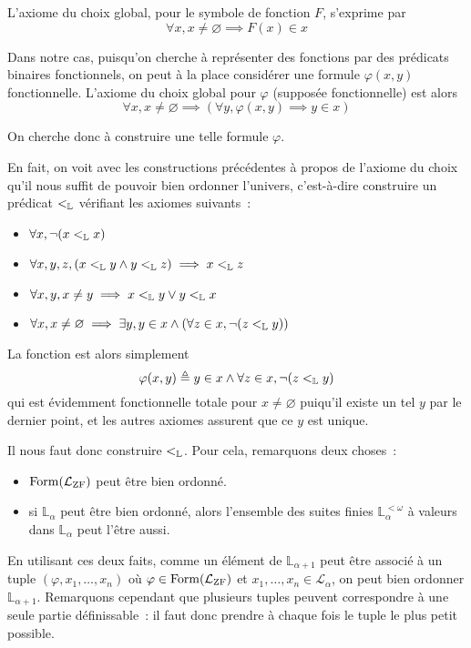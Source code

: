 \begin{axiom}
  L'axiome du choix global, pour le symbole de fonction $F$, s'exprime par
  \[\forall x, x\neq \varnothing \implies F(x)\in x\]
\end{axiom}

Dans notre cas, puisqu'on cherche à représenter des fonctions par des prédicats
binaires fonctionnels, on peut à la place considérer une formule $\varphi(x,y)$
fonctionnelle. L'axiome du choix global pour $\varphi$ (supposée fonctionnelle)
est alors
\[\forall x, x \neq \varnothing \implies (\forall y, \varphi(x,y)\implies
y\in x)\]

On cherche donc à construire une telle formule $\varphi$.

En fait, on voit avec les constructions précédentes à propos de l'axiome du
choix qu'il nous suffit de pouvoir bien ordonner l'univers, c'est-à-dire
construire un prédicat $<_{\mathbb L}$ vérifiant les axiomes suivants~:
\begin{itemize}
\item $\forall x, \lnot(x <_{\mathbb L} x)$
\item $\forall x,y,z, (x <_{\mathbb L} y \land y <_{\mathbb L} z) \implies x <_{\mathbb L} z$
\item $\forall x,y, x\neq y \implies x <_{\mathbb L} y \lor y <_{\mathbb L} x$
\item $\forall x, x\neq \varnothing \implies
  \exists y, y \in x \land (\forall z \in x, \lnot (z <_{\mathbb L} y))$
\end{itemize}
La fonction est alors simplement
\[\varphi(x,y) \triangleq y \in x \land \forall z \in x, \lnot(z <_{\mathbb L} y)\]
qui est évidemment fonctionnelle totale pour $x\neq \varnothing$ puiqu'il existe
un tel $y$ par le dernier point, et les autres axiomes assurent que ce $y$ est
unique.

Il nous faut donc construire $<_{\mathbb L}$. Pour cela, remarquons deux choses~:
\begin{itemize}
\item $\operatorname{Form}(\mathcal L_{\operatorname{ZF}})$ peut être bien ordonné.
\item si $\mathbb L_\alpha$ peut être bien ordonné, alors l'ensemble des
  suites finies $\mathbb L_\alpha^{<\omega}$ à valeurs dans $\mathbb L_\alpha$
  peut l'être aussi.
\end{itemize}
En utilisant ces deux faits, comme un élément de $\mathbb L_{\alpha + 1}$
peut être associé à un tuple $(\varphi,x_1,\ldots,x_n)$ où
$\varphi\in\operatorname{Form}(\mathcal L_{\operatorname{ZF}})$ et $x_1,\ldots,x_n \in\mathcal L_{\alpha}$,
on peut bien ordonner $\mathbb L_{\alpha + 1}$. Remarquons cependant que
plusieurs tuples peuvent correspondre à une seule partie définissable~: il faut
donc prendre à chaque fois le tuple le plus petit possible.

